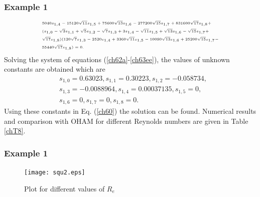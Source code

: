 \documentclass{beamer}
\begin{document}
\begin{frame}\frametitle{Example 1}
	\justifying
\begin{equation}\label{ch63ee}
\tiny
\begin{aligned}
&5040s_{1,4}-15120 \sqrt{11} s_{1,5}+75600 \sqrt{13} s_{1,6}-277200 \sqrt{15} s_{1,7}+831600 \sqrt{17} s_{1,8}+\\
&(s_{1,0}-\sqrt{3} s_{1,1}+\sqrt{5} s_{1,2}-\sqrt{7} s_{1,3}+3 s_{1,4}-\sqrt{11} s_{1,5}+\sqrt{13} s_{1,6}-\sqrt{15} s_{1,7}+\\
&\sqrt{17} s_{1,8})(120 \sqrt{7} s_{1,3}-2520 s_{1,4}+3360 \sqrt{11} s_{1,5}-10080 \sqrt{13} s_{1,6}+25200 \sqrt{15} s_{1,7}-\\
&55440 \sqrt{17} s_{1,8})=0.\\
\end{aligned}
\end{equation}
Solving the system of equations (\ref{ch62a}-\ref{ch63ee}), the values of unknown constants are obtained which are
\begin{align}
 &s_{1,0}= 0.63023, s_{1,1}=0.30223, s_{1,2}=-0.058734,\nonumber\\ &s_{1,3}=-0.0088964, s_{1,4}= 0.00037135, s_{1,5}=0,\nonumber\\ &s_{1,6}=0, s_{1,7}=0, s_{1,8}=0.\nonumber
 \end{align}
  Using these constants in Eq. (\ref{ch60}) the solution can be found. Numerical results and comparison with OHAM for different Reynolds numbers are given in Table \ref{chT8}.	
\end{frame}	
\begin{frame}\frametitle{Example 1}
	\justifying
\begin{figure}[h]
	\centering
	\texttt{[image: squ2.eps]}\\
	\caption{Plot for different values of $R_{e}$}\label{chF8}
\end{figure}
\end{frame}
\end{document}
